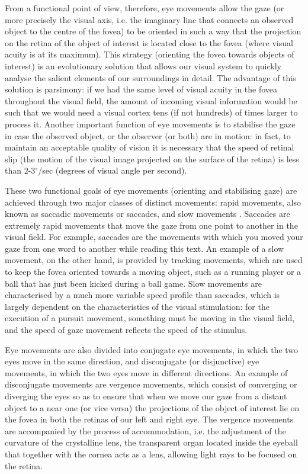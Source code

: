 \documentclass[11pt]{article}
\begin{document}
From a functional point of view, therefore, eye movements allow the gaze (or more precisely the visual axis, i.e. the imaginary line that connects an observed object to the centre of the fovea) to be oriented in such a way that the projection on the retina of the object of interest is located close to the fovea (where visual acuity is at its maximum). This strategy (orienting the fovea towards objects of interest) is an evolutionary solution that allows our visual system to quickly analyse the salient elements of our surroundings in detail. The advantage of this solution is parsimony: if we had the same level of visual acuity in the fovea throughout the visual field, the amount of incoming visual information would be such that we would need a visual cortex tens (if not hundreds) of times larger to process it. Another important function of eye movements is to stabilise the gaze in case the observed object, or the observer (or both) are in motion: in fact, to maintain an acceptable quality of vision it is necessary that the speed of retinal slip (the motion of the visual image projected on the surface of the retina) is less than 2-3$^{\circ}$/sec (degrees of visual angle per second).

These two functional goals of eye movements (orienting and stabilising gaze) are achieved through two major classes of distinct movements: rapid movements, also known as saccadic movements or saccades, and slow movements \cite{Steinman1990}. Saccades are extremely rapid movements that move the gaze from one point to another in the visual field. For example, saccades are the movements with which you moved your gaze from one word to another while reading this text. An example of a slow movement, on the other hand, is provided by tracking movements, which are used to keep the fovea oriented towards a moving object, such as a running player or a ball that has just been kicked during a ball game. Slow movements are characterised by a much more variable speed profile than saccades, which is largely dependent on the characteristics of the visual stimulation: for the execution of a pursuit movement, something must be moving in the visual field, and the speed of gaze movement reflects the speed of the stimulus.

Eye movements are also divided into conjugate eye movements, in which the two eyes move in the same direction, and disconjugate (or disjunctive) eye movements, in which the two eyes move in different directions. An example of disconjugate movements are vergence movements, which consist of converging or diverging the eyes so as to ensure that when we move our gaze from a distant object to a near one (or vice versa) the projections of the object of interest lie on the fovea in both the retinas of our left and right eye. The vergence movements are accompanied by the process of accommodation, i.e. the adjustment of the curvature of the crystalline lens, the transparent organ located inside the eyeball that together with the cornea acts as a lens, allowing light rays to be focused on the retina.
\end{document}
